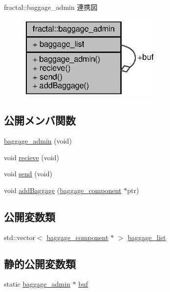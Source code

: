 fractal\+:\+:baggage\+\_\+admin 連携図
\nopagebreak
\begin{figure}[H]
\begin{center}
\leavevmode
\includegraphics[width=203pt]{classfractal_1_1baggage__admin__coll__graph}
\end{center}
\end{figure}
\subsection*{公開メンバ関数}
\begin{DoxyCompactItemize}
\item 
\hyperlink{classfractal_1_1baggage__admin_a5f0d4b9b9fc7345b4686f5d9100137c0}{baggage\+\_\+admin} (void)
\item 
void \hyperlink{classfractal_1_1baggage__admin_a5ac84caf1682026eb58b319cae6289f3}{recieve} (void)
\item 
void \hyperlink{classfractal_1_1baggage__admin_a8fe4cbff60f094b3c659931c0cd3d251}{send} (void)
\item 
void \hyperlink{classfractal_1_1baggage__admin_a0d53a03fac20a4641edb09f4ad422ad2}{add\+Baggage} (\hyperlink{classfractal_1_1baggage__component}{baggage\+\_\+component} $\ast$ptr)
\end{DoxyCompactItemize}
\subsection*{公開変数類}
\begin{DoxyCompactItemize}
\item 
std\+::vector$<$ \hyperlink{classfractal_1_1baggage__component}{baggage\+\_\+component} $\ast$ $>$ \hyperlink{classfractal_1_1baggage__admin_afd92550fac7866335a3b55b78174887f}{baggage\+\_\+list}
\end{DoxyCompactItemize}
\subsection*{静的公開変数類}
\begin{DoxyCompactItemize}
\item 
static \hyperlink{classfractal_1_1baggage__admin}{baggage\+\_\+admin} $\ast$ \hyperlink{classfractal_1_1baggage__admin_a318bc60961b007f5430f859a6c9bba75}{buf}
\end{DoxyCompactItemize}


